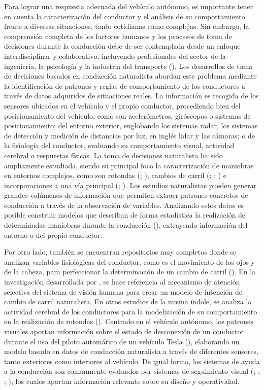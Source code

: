 Para lograr una respuesta adecuada del vehículo autónomo, es importante tener en cuenta la caracterización del conductor y el análisis de su comportamiento frente a diversas situaciones, tanto cotidianas como complejas. Sin embargo, la comprensión completa de los factores humanos y los procesos de toma de decisiones durante la conducción debe de ser contemplada desde un enfoque interdisciplinar y colaborativo, incluyendo profesionales del sector de la ingeniería, la psicología y la industria del transporte (\cite{cacciabue}). Los desarrollos de toma de decisiones basados en conducción naturalista abordan este problema mediante la identificación de patrones y reglas de comportamiento de los conductores a través de datos adquiridos de situaciones reales. La información es recogida de los sensores ubicados en el vehículo y el propio conductor, procediendo bien del posicionamiento del vehículo, como son acelerómetros, giróscopos o sistemas de posicionamiento; del entorno exterior, englobando los sistemas radar, los sistemas de detección y medición de distancias por luz, en inglés \gls{lidar} y las cámaras; o de la fisiología del conductor, evaluando su comportamiento visual, actividad cerebral o respuestas físicas. La toma de decisiones naturalista ha sido ampliamente estudiada, siendo su principal foco la caracterización de maniobras en entornos complejos, como son rotondas (\cite{cuenca}; \cite{kong}), cambios de carril (\cite{yang19}; \cite{shawky}; \cite{ali21}) e incorporaciones a una vía principal (\cite{kang}; \cite{gu}). Los estudios naturalistas pueden generar grandes volúmenes de información que permiten extraer patrones concretos de conducción a través de la observación de variables. Analizando estos datos es posible construir modelos que describan de forma estadística la realización de determinadas maniobras durante la conducción (\cite{bender}), extrayendo información del entorno o del propio conductor. 

Por otro lado, también se encuentran repositorios muy completos donde se analizan variables fisiológicas del conductor, como es el movimiento de los ojos y de la cabeza, para perfeccionar la determinación de un cambio de carril (\cite{deng}). En la investigación desarrollada por \textcite{xia}, se hace referencia al mecanismo de atención selectiva del sistema de visión humana para crear un modelo de intención de cambio de carril naturalista. En otros estudios de la misma índole, se analiza la actividad cerebral de los conductores para la modelización de su comportamiento en la realización de rotondas (\cite{monsalve}). Centrado en el vehículo autónomo, los patrones visuales aportan información sobre el estado de desconexión de un conductor durante el uso del piloto automático de un vehículo Tesla (\cite{morando}), elaborando un modelo basado en datos de conducción naturalista a través de diferentes sensores, tanto exteriores como interiores al vehículo. De igual forma, los sistemas de ayuda a la conducción son comúnmente evaluados por sistemas de seguimiento visual (\cite{sanchez}; \cite{azevedo}; \cite{schindler}; \cite{zhou}), los cuales aportan información relevante sobre su diseño y operatividad.

